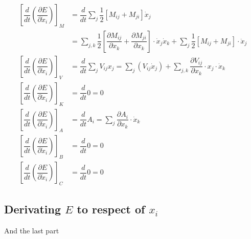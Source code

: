 \documentclass[a4paper]{article}
\begin{document}
\begin{align*} 
\left[\dfrac{d}{dt}\left(\dfrac{\partial E}{\partial \dot{x}_{i}}\right)\right]_{M} & = \dfrac{d}{dt} \sum_{j}\dfrac{1}{2}\left[M_{ij} + M_{ji}\right] \dot{x}_{j} \\ 
& = \sum_{j, k} \dfrac{1}{2} \left[\dfrac{\partial M_{ij}}{\partial x_{k}} + \dfrac{\partial M_{ji}}{\partial x_{k}} \right] \cdot \dot{x}_{j}\dot{x}_{k} + \sum_{j} \dfrac{1}{2}\left[M_{ij}+M_{ji}\right] \cdot \ddot{x}_{j} \\
\left[\dfrac{d}{dt}\left(\dfrac{\partial E}{\partial \dot{x}_{i}}\right)\right]_{V} & = \dfrac{d}{dt} \sum_{j} V_{ij} x_{j} = \sum_{j} \left(V_{ij} \dot{x}_{j}\right) + \sum_{j, k} \dfrac{\partial V_{ij}}{\partial x_{k}} \cdot x_{j} \cdot \dot{x}_{k} \\
\left[\dfrac{d}{dt}\left(\dfrac{\partial E}{\partial \dot{x}_{i}}\right)\right]_{K} & = \dfrac{d}{dt} 0 = 0  \\
\left[\dfrac{d}{dt}\left(\dfrac{\partial E}{\partial \dot{x}_{i}}\right)\right]_{A} & = \dfrac{d}{dt} A_{i}  = \sum_{j} \dfrac{\partial A_{i}}{\partial x_{k}} \cdot \dot{x}_{k} \\
\left[\dfrac{d}{dt}\left(\dfrac{\partial E}{\partial \dot{x}_{i}}\right)\right]_{B} & = \dfrac{d}{dt} 0  =  0 \\
\left[\dfrac{d}{dt}\left(\dfrac{\partial E}{\partial \dot{x}_{i}}\right)\right]_{C} & = \dfrac{d}{dt} 0  =  0 
\end{align*}
 

\pagebreak 

\subsection{Derivating $E$ to respect of $x_{i}$}

And the last part 
 
\end{document}
